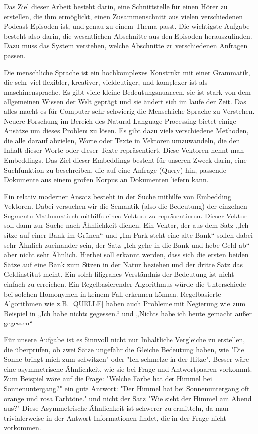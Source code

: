 Das Ziel dieser Arbeit besteht darin, eine Schnittstelle für einen Hörer zu erstellen, die ihm ermöglicht, einen Zusammenschnitt aus vielen verschiedenen Podcast Episoden ist, und genau zu einem Thema passt. 
Die wichtigste Aufgabe besteht also darin, die wesentlichen Abschnitte aus den Episoden herauszufinden. 
Dazu muss das System verstehen, welche Abschnitte zu verschiedenen Anfragen passen. 

Die menschliche Sprache ist ein hochkomplexes Konstrukt mit einer Grammatik, die sehr viel flexibler, kreativer, vieldeutiger, und komplexer ist als maschinensprache. 
Es gibt viele kleine Bedeutungsnuancen, sie ist stark von dem allgemeinen Wissen der Welt geprägt und sie ändert sich im laufe der Zeit. 
Das alles macht es für Computer sehr schwierig die Menschliche Sprache zu Verstehen. 
Neuere Forschung im Bereich des Natural Language Processing bietet einige Ansätze um dieses Problem zu lösen. 
Es gibt dazu viele verschiedene Methoden, die alle darauf abzielen, Worte oder Texte in Vektoren umzuwandeln, die den Inhalt dieser Worte oder dieser Texte repräsentiert.
Diese Vektoren nennt man Embeddings.
Das Ziel dieser Embeddings besteht für unseren Zweck darin, eine Suchfunktion zu beschreiben, die auf eine Anfrage (Query) hin, passende Dokumente aus einem großen Korpus an Dokumenten liefern kann.

Ein relativ moderner Ansatz besteht in der Suche mithilfe von Embedding Vektoren. 
Dabei versuchen wir die Semantik (also die Bedeutung) der einzelnen Segmente Mathematisch mithilfe eines Vektors zu repräsentieren. 
Dieser Vektor soll dann zur Suche nach Ähnlichkeit dienen. Ein Vektor, der aus dem Satz „Ich sitze auf einer Bank im Grünen“ und „Im Park steht eine alte Bank“ sollen dabei sehr Ähnlich zueinander sein, der Satz „Ich gehe in die Bank und hebe Geld ab“ aber nicht sehr Ähnlich. 
Hierbei soll erkannt werden, dass sich die ersten beiden Sätze auf eine Bank zum Sitzen in der Natur beziehen und der dritte Satz das Geldinstitut meint. 
Ein solch filigranes Verständnis der Bedeutung ist nicht einfach zu erreichen. 
Ein Regelbasierender Algorithmus würde die Unterschiede bei solchen Homonymen in keinem Fall erkennen können. 
Regelbasierte Algorithmen wie z.B. [QUELLE] haben auch Probleme mit Negierung wie zum Beispiel in „Ich habe nichts gegessen.“ und „Nichts habe ich heute gemacht außer gegessen“.

Für unsere Aufgabe ist es Sinnvoll nicht nur Inhaltliche Vergleiche zu erstellen, die überprüfen, ob zwei Sätze ungefähr die Gleiche Bedeutung haben, wie "Die Sonne bringt mich zum schwitzen" oder "Ich schmelze in der Hitze".
Besser wäre eine asymmetrische Ähnlichkeit, wie sie bei Frage und Antwortpaaren vorkommt.
Zum Beispiel wäre auf die Frage: "Welche Farbe hat der Himmel bei Sonnenuntergang?" ein gute Antwort: "Der Himmel hat bei Sonnenuntergang oft orange und rosa Farbtöne."  und nicht der Satz "Wie sieht der Himmel am Abend aus?"
Diese Asymmetrische Ähnlichkeit ist schwerer zu ermitteln, da man trivialerweise in der Antwort Informationen findet, die in der Frage nicht vorkommen.

